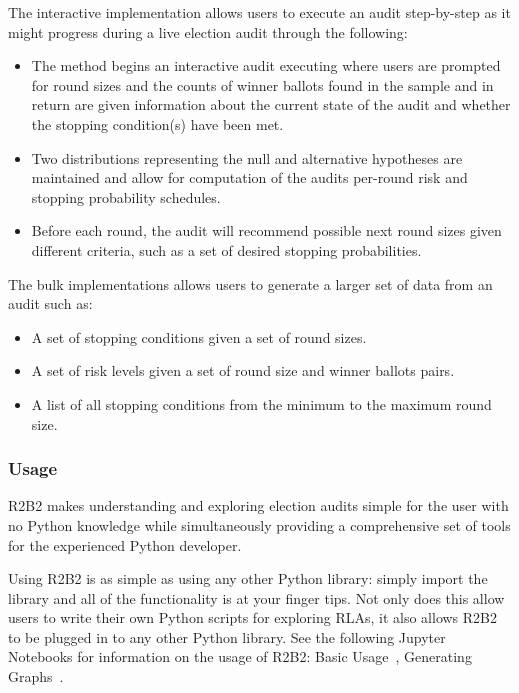 The interactive implementation allows users to execute an audit step-by-step as it
might progress during a live election audit through the following:

\begin{itemize}
    \item The  method begins an interactive audit executing where users
    are prompted for round sizes and the counts of winner ballots found in the sample
    and in return are given information about the current state of the audit and whether
    the stopping condition(s) have been met.
    \item Two distributions representing the null and alternative hypotheses are maintained
    and allow for computation of the audits per-round risk and stopping probability
    schedules.
    \item Before each round, the audit will recommend possible next round sizes given
    different criteria, such as a set of desired stopping probabilities.
\end{itemize}
The bulk implementations allows users to generate a larger set of data from an audit
such as:

\begin{itemize}
    \item A set of stopping conditions given a set of round sizes.
    \item A set of risk levels given a set of round size and winner ballots pairs.
    \item A list of all stopping conditions from the minimum to the maximum round size.
\end{itemize}

\subsubsection{Usage}

R2B2 makes understanding and exploring election audits simple for the user with no
Python knowledge while simultaneously providing a comprehensive set of tools for
the experienced Python developer.

Using R2B2 is as simple as using any other Python library: simply import the library
and all of the functionality is at your finger tips. Not only does this allow users
to write their own Python scripts for exploring RLAs, it also allows R2B2 to be plugged
in to any other Python library. See the following Jupyter Notebooks for information on
the usage of R2B2: Basic Usage~\cite{jupyterBasic}, Generating Graphs~\cite{jupyterGraphs}.

